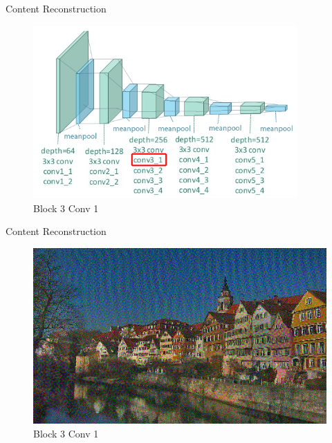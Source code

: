 \documentclass{beamer}
\begin{document}
\begin{frame}{Content Reconstruction}
\begin{figure}[ht]
\centering
\caption{Block 3 Conv 1}
\includegraphics[width=0.9\textwidth]{img/vgg19/content/block3_conv1}
\end{figure}
\end{frame}
\begin{frame}{Content Reconstruction}
\begin{figure}[ht]
\centering
\caption{Block 3 Conv 1}
\includegraphics[width=\textwidth]{img/content/block3_conv1.png}
\end{figure}
\end{frame}
\end{document}
